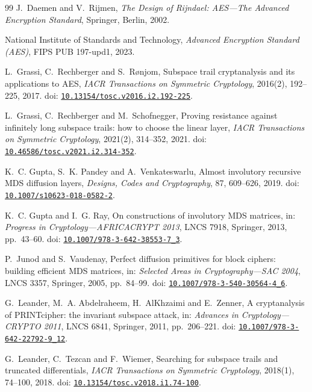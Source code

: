 \documentclass[10pt,reqno]{amsart}
\theoremstyle{plain}
\theoremstyle{remark}\newtheorem{remark}[theorem]{Remark}
\theoremstyle{definition}\newtheorem{definition}[theorem]{Definition}
\begin{document}
\begin{thebibliography}{99}
J.~Daemen and V.~Rijmen,
\emph{The Design of Rijndael: AES---The Advanced Encryption Standard},
Springer, Berlin, 2002.

National Institute of Standards and Technology,
\emph{Advanced Encryption Standard (AES)},
FIPS PUB 197-upd1, 2023.

L.~Grassi, C.~Rechberger and S.~R{\o}njom,
Subspace trail cryptanalysis and its applications to AES,
\emph{IACR Transactions on Symmetric Cryptology},
2016(2), 192--225, 2017. doi: \href{https://doi.org/10.13154/tosc.v2016.i2.192-225}{\nolinkurl{10.13154/tosc.v2016.i2.192-225}}.

L.~Grassi, C.~Rechberger and M.~Schofnegger,
Proving resistance against infinitely long subspace trails:
how to choose the linear layer,
\emph{IACR Transactions on Symmetric Cryptology},
2021(2), 314--352, 2021. doi: \href{https://doi.org/10.46586/tosc.v2021.i2.314-352}{\nolinkurl{10.46586/tosc.v2021.i2.314-352}}.

K.~C. Gupta, S.~K. Pandey and A.~Venkateswarlu,
Almost involutory recursive MDS diffusion layers,
\emph{Designs, Codes and Cryptography},
87, 609--626, 2019. doi: \href{https://doi.org/10.1007/s10623-018-0582-2}{\nolinkurl{10.1007/s10623-018-0582-2}}.

K.~C. Gupta and I.~G. Ray,
On constructions of involutory MDS matrices,
in: \emph{Progress in Cryptology---AFRICACRYPT 2013},
LNCS 7918, Springer, 2013, pp.~43--60. doi: \href{https://doi.org/10.1007/978-3-642-38553-7_3}{\nolinkurl{10.1007/978-3-642-38553-7_3}}.

P.~Junod and S.~Vaudenay,
Perfect diffusion primitives for block ciphers:
building efficient MDS matrices,
in: \emph{Selected Areas in Cryptography---SAC 2004},
LNCS 3357, Springer, 2005, pp.~84--99. doi: \href{https://doi.org/10.1007/978-3-540-30564-4_6}{\nolinkurl{10.1007/978-3-540-30564-4_6}}.

G.~Leander, M.~A. Abdelraheem, H.~AlKhzaimi and E.~Zenner,
A cryptanalysis of PRINTcipher: the invariant subspace attack,
in: \emph{Advances in Cryptology---CRYPTO 2011},
LNCS 6841, Springer, 2011, pp.~206--221. doi: \href{https://doi.org/10.1007/978-3-642-22792-9_12}{\nolinkurl{10.1007/978-3-642-22792-9_12}}.

G.~Leander, C.~Tezcan and F.~Wiemer,
Searching for subspace trails and truncated differentials,
\emph{IACR Transactions on Symmetric Cryptology},
2018(1), 74--100, 2018. doi: \href{https://doi.org/10.13154/tosc.v2018.i1.74-100}{\nolinkurl{10.13154/tosc.v2018.i1.74-100}}.


\end{thebibliography}
\end{document}
